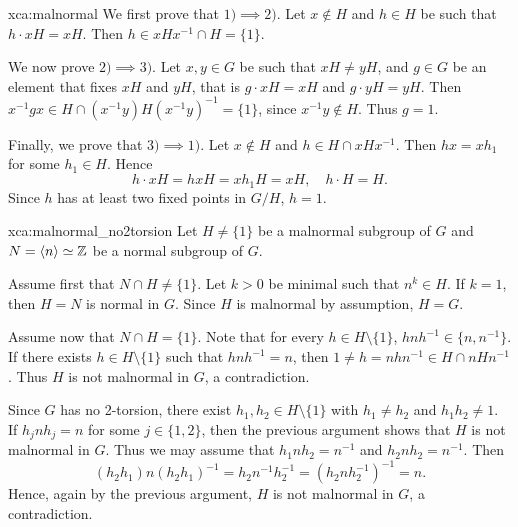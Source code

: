 \begin{sol}{xca:malnormal}
    We first prove that $1)\implies2)$. Let $x\not\in H$ and 
    $h\in H$ be such that $h\cdot xH=xH$. Then 
    $h\in xHx^{-1}\cap H=\{1\}$. 

    We now prove $2)\implies3)$. Let $x,y\in G$ be such that 
    $xH\ne yH$, and $g\in G$ be an element 
    that fixes $xH$ and $yH$, that is 
    $g\cdot xH=xH$ and $g\cdot yH=yH$. Then 
    $x^{-1}gx\in H\cap (x^{-1}y)H(x^{-1}y)^{-1}=\{1\}$,
    since $x^{-1}y\not\in H$. Thus $g=1$. 

    Finally, we prove that $3)\implies1)$. Let $x\not\in H$ and $h\in H\cap xHx^{-1}$. Then 
    $hx=xh_1$ for some $h_1\in H$. Hence
    \[
    h\cdot xH=hxH=xh_1H=xH,\quad 
    h\cdot H=H.
    \]
    Since $h$ has at least two fixed points
    in $G/H$, $h=1$. 
\end{sol}

\begin{sol}{xca:malnormal_no2torsion}
    Let $H\ne\{1\}$ be a malnormal subgroup of $G$ and $N=\langle n\rangle\simeq\mathbb{Z}$ be a
    normal subgroup of $G$. 

    Assume first that $N\cap H\ne\{1\}$. Let $k>0$ be minimal such that $n^k\in H$. If $k=1$, then
    $H=N$ is normal in $G$. Since $H$ is malnormal by assumption, $H=G$. 
    
    Assume now that $N\cap H=\{1\}$. Note that
    for every $h\in H\setminus\{1\}$, 
    $hnh^{-1}\in\{n,n^{-1}\}$. 
    If there exists 
    $h\in H\setminus\{1\}$ such that $hnh^{-1}=n$, then
    $1\ne h=nhn^{-1}\in H\cap nHn^{-1}$. Thus $H$ is not malnormal in $G$, a contradiction. 

    Since $G$ has no 2-torsion, there exist 
    $h_1,h_2\in H\setminus\{1\}$ with $h_1\ne h_2$ and 
    $h_1h_2\ne 1$. If $h_jnh_j=n$ for some $j\in\{1,2\}$, 
    then the previous argument shows that 
    $H$ is not malnormal in $G$. Thus we may assume that  $h_1nh_2=n^{-1}$ and 
    $h_2nh_2=n^{-1}$. Then 
    \[
    (h_2h_1)n(h_2h_1)^{-1}=h_2n^{-1}h_2^{-1}
    =(h_2nh_2^{-1})^{-1}=n.
    \]
    Hence, again by the previous argument, 
    $H$ is not malnormal in $G$, a contradiction.  
\end{sol}